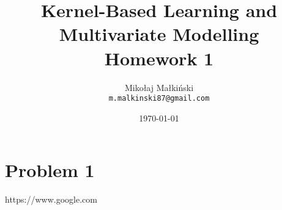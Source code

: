 \documentclass[a4paper,12pt]{article}
\title{
	\textbf{Kernel-Based Learning and Multivariate Modelling}\\
	\bigskip
	\textbf{Homework 1}\\
	\bigskip
}
\author{
	Mikołaj Małkiński \\
	\texttt{m.malkinski87@gmail.com}
}
\date{\today}
\begin{document}
\maketitle

\section{Problem 1}

\begin{thebibliography}{1}

	 https://www.google.com

\end{thebibliography}
\end{document}
